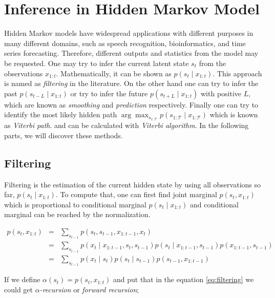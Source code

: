 \section{Inference in Hidden Markov Model}
\label{section:Inference-in-HMM}

Hidden Markov models have widespread applications with different purposes in many different domains, such as speech recognition, bioinformatics, and time series forecasting. Therefore, different outputs and statistics from the model may be requested.
One may try to infer the current latent state $s_t$ from the observations $x_{1:t}$. Mathematically, it can be shown as $p\left(s_t\mid x_{1:t}\right)$. 
This approach is named as {\it filtering} in the literature. 
On the other hand one can try to infer the past $p\left(s_{t-L}\mid x_{1:t}\right)$ or try to infer the future $p\left(s_{t+L}\mid x_{1:t}\right)$ with positive $L$, 
which are known as {\it smoothing} and {\it prediction} respectively. 
Finally one can try to identify the most likely hidden path $\arg\max_{s_{1 : \mathcal{T}}} p\left(s_{1 : \mathcal{T}} \mid x_{1 : \mathcal{T}}\right)$ which is known as {\it Viterbi path}. and can be calculated with {\it Viterbi algorithm}.
In the following parts, we will discover these methods.

\subsection{Filtering}
Filtering is the estimation of the current hidden state by using all observations so far, $p\left(s_t \mid x_{1:t}\right)$. 
To compute that, one can first find joint marginal $p\left(s_t,x_{1:t}\right)$ which is proportional to conditional marginal $p\left(s_t\mid x_{1:t}\right)$ and conditional marginal can be reached by the normalization.

\begin{eqnarray} 
p\left(s_{t}, x_{1 : t}\right) & = & \sum_{s_{t-1}} p\left(s_{t}, s_{t-1}, x_{1 : t-1}, x_{t}\right) \\ 
& = & \sum_{s_{t-1}} p\left(x_{t} \mid x_{1 : t-1}, s_{t}, s_{t-1}\right) p\left(s_{t}\mid x_{1 : t-1}, s_{t-1}\right) p\left(x_{1 : t-1}, s_{t-1}\right)\\ 
& = & \sum_{s_{t-1}} p\left(x_{t} \mid s_{t}\right) p\left(s_{t} \mid s_{t-1}\right) p\left(s_{t-1}, x_{1 : t-1}\right) \label{eq:filtering}
\end{eqnarray}

If we define $\alpha \left(s_t\right) = p\left(s_{t}, x_{1 : t}\right)$ and put that in the equation \ref{eq:filtering} we could get {\it $\alpha$-recursion} or {\it forward recursion};

